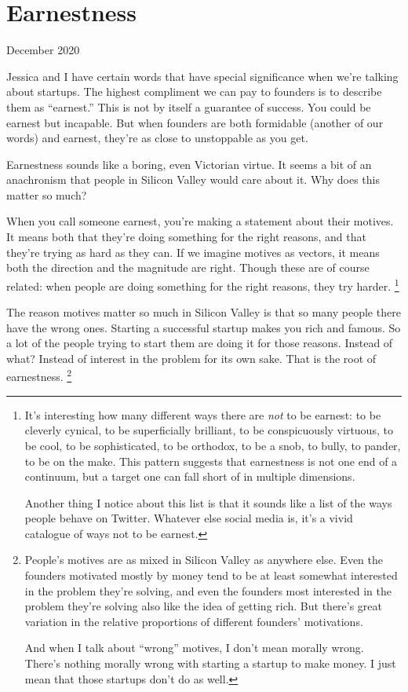 \chapter{Earnestness}

December 2020

Jessica and I have certain words that have special significance when
we're talking about startups. The highest compliment we can pay to
founders is to describe them as ``earnest.'' This is not by itself a
guarantee of success. You could be earnest but incapable. But when
founders are both formidable (another of our words) and earnest, they're
as close to unstoppable as you get.

Earnestness sounds like a boring, even Victorian virtue. It seems a bit
of an anachronism that people in Silicon Valley would care about it. Why
does this matter so much?

When you call someone earnest, you're making a statement about their
motives. It means both that they're doing something for the right
reasons, and that they're trying as hard as they can. If we imagine
motives as vectors, it means both the direction and the magnitude are
right. Though these are of course related: when people are doing
something for the right reasons, they try harder.
\footnote{It's interesting how many different ways there are \emph{not} to
be earnest: to be cleverly cynical, to be superficially brilliant, to be
conspicuously virtuous, to be cool, to be sophisticated, to be orthodox,
to be a snob, to bully, to pander, to be on the make. This pattern
suggests that earnestness is not one end of a continuum, but a target
one can fall short of in multiple dimensions.

Another thing I notice about this list is that it sounds like a list of
the ways people behave on Twitter. Whatever else social media is, it's a
vivid catalogue of ways not to be earnest.}

The reason motives matter so much in Silicon Valley is that so many
people there have the wrong ones. Starting a successful startup makes
you rich and famous. So a lot of the people trying to start them are
doing it for those reasons. Instead of what? Instead of interest in the
problem for its own sake. That is the root of earnestness.
\footnote{People's motives are as mixed in Silicon Valley as anywhere
else. Even the founders motivated mostly by money tend to be at least
somewhat interested in the problem they're solving, and even the
founders most interested in the problem they're solving also like the
idea of getting rich. But there's great variation in the relative
proportions of different founders' motivations.

And when I talk about ``wrong'' motives, I don't mean morally wrong.
There's nothing morally wrong with starting a startup to make money. I
just mean that those startups don't do as well.}

